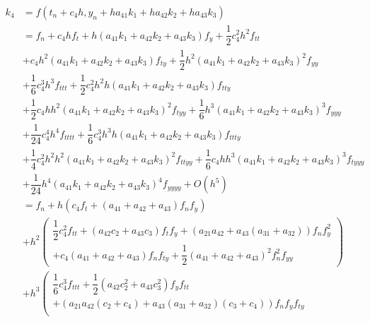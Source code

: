 \documentclass[a4paper,oneside]{book}
\numberwithin{equation}{chapter}
\begin{document}
\begin{align}
{k_4} &= f\left( {{t_n} + {c_4}h,{y_n} + h{a_{41}}{k_1} + h{a_{42}}{k_2} + h{a_{43}}{k_3}} \right)\\
&= {f_n} + {c_4}h{f_t} + h\left( {{a_{41}}{k_1} + {a_{42}}{k_2} + {a_{43}}{k_3}} \right){f_y} + \dfrac{1}{2}c_4^2{h^2}{f_{tt}}\\
& + {c_4}{h^2}\left( {{a_{41}}{k_1} + {a_{42}}{k_2} + {a_{43}}{k_3}} \right){f_{ty}} + \dfrac{1}{2}{h^2}{\left( {{a_{41}}{k_1} + {a_{42}}{k_2} + {a_{43}}{k_3}} \right)^2}{f_{yy}}\\
& + \dfrac{1}{6}c_4^3{h^3}{f_{ttt}} + \dfrac{1}{2}c_4^2{h^2}h\left( {{a_{41}}{k_1} + {a_{42}}{k_2} + {a_{43}}{k_3}} \right){f_{tty}}\\
& + \dfrac{1}{2}{c_4}h{h^2}{\left( {{a_{41}}{k_1} + {a_{42}}{k_2} + {a_{43}}{k_3}} \right)^2}{f_{tyy}} + \dfrac{1}{6}{h^3}{\left( {{a_{41}}{k_1} + {a_{42}}{k_2} + {a_{43}}{k_3}} \right)^3}{f_{yyy}}\\
& + \dfrac{1}{{24}}c_4^4{h^4}{f_{tttt}} + \dfrac{1}{6}c_4^3{h^3}h\left( {{a_{41}}{k_1} + {a_{42}}{k_2} + {a_{43}}{k_3}} \right){f_{ttty}}\\
 &+ \dfrac{1}{4}c_4^2{h^2}{h^2}{\left( {{a_{41}}{k_1} + {a_{42}}{k_2} + {a_{43}}{k_3}} \right)^2}{f_{ttyy}} + \dfrac{1}{6}{c_4}h{h^3}{\left( {{a_{41}}{k_1} + {a_{42}}{k_2} + {a_{43}}{k_3}} \right)^3}{f_{tyyy}}\\
& + \dfrac{1}{{24}}{h^4}{\left( {{a_{41}}{k_1} + {a_{42}}{k_2} + {a_{43}}{k_3}} \right)^4}{f_{yyyy}} + O\left( {{h^5}} \right)\\
&=  {f_n} + h\left( {{c_4}{f_t} + \left( {{a_{41}} + {a_{42}} + {a_{43}}} \right){f_n}{f_y}} \right)\\
 &+ {h^2}\left( \begin{array}{l}
\dfrac{1}{2}c_4^2{f_{tt}} + \left( {{a_{42}}{c_2} + {a_{43}}{c_3}} \right){f_t}{f_y} + \left( {{a_{21}}{a_{42}} + {a_{43}}\left( {{a_{31}} + {a_{32}}} \right)} \right){f_n}f_y^2\\
 + {c_4}\left( {{a_{41}} + {a_{42}} + {a_{43}}} \right){f_n}{f_{ty}} + \dfrac{1}{2}{\left( {{a_{41}} + {a_{42}} + {a_{43}}} \right)^2}f_n^2{f_{yy}}
\end{array} \right)\\
 &+ {h^3}\left( \begin{array}{l}
\dfrac{1}{6}c_4^3{f_{ttt}} + \dfrac{1}{2}\left( {{a_{42}}c_2^2 + {a_{43}}c_3^2} \right){f_y}{f_{tt}}\\
 + \left( {{a_{21}}{a_{42}}\left( {{c_2} + {c_4}} \right) + {a_{43}}\left( {{a_{31}} + {a_{32}}} \right)\left( {{c_3} + {c_4}} \right)} \right){f_n}{f_y}{f_{ty}}\\

\end{array}
\end{align}
\end{document}
